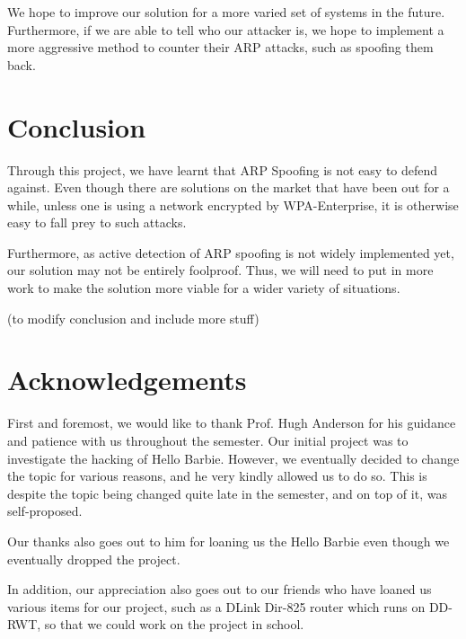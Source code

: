 \documentclass{acm_proc_article-sp}
\begin{document}
We hope to improve our solution for a more varied set of systems in the future. Furthermore, if we are able to tell who our attacker is, we hope to implement a more aggressive method to counter their ARP attacks, such as spoofing them back. 

\section{Conclusion}
Through this project, we have learnt that ARP Spoofing is not easy to defend against. Even though there are solutions on the market that have been out for a while, unless one is using a network encrypted by WPA-Enterprise, it is otherwise easy to fall prey to such attacks. 

Furthermore, as active detection of ARP spoofing is not widely implemented yet, our solution may not be entirely foolproof. Thus, we will need to put in more work to make the solution more viable for a wider variety of situations. 

(to modify conclusion and include more stuff) 

\section{Acknowledgements}
First and foremost, we would like to thank Prof. Hugh Anderson for his guidance and patience with us throughout the semester. Our initial project was to investigate the hacking of Hello Barbie. However, we eventually decided to change the topic for various reasons, and he very kindly allowed us to do so. This is despite the topic being changed quite late in the semester, and on top of it, was self-proposed. 

Our thanks also goes out to him for loaning us the Hello Barbie even though we eventually dropped the project. 

In addition, our appreciation also goes out to our friends who have loaned us various items for our project, such as a DLink Dir-825 router which runs on DD-RWT, so that we could work on the project in school. 

%

%
%
\end{document}

